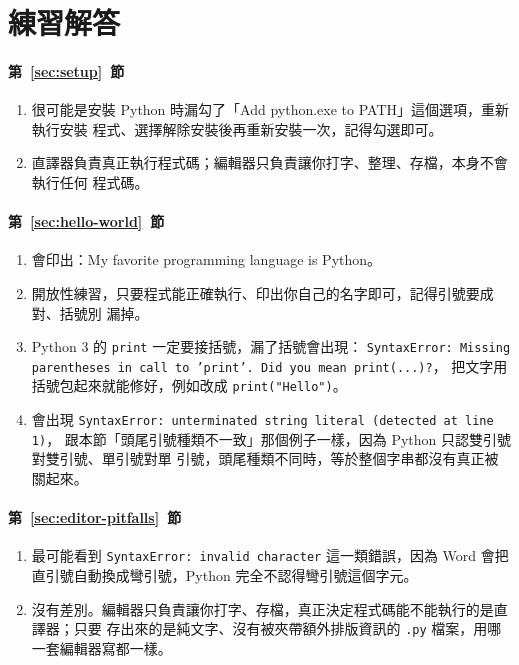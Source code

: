 \section*{練習解答}

\paragraph{第~\ref{sec:setup}~節}
\begin{enumerate}
\item 很可能是安裝 Python 時漏勾了「Add python.exe to PATH」這個選項，重新執行安裝
程式、選擇解除安裝後再重新安裝一次，記得勾選即可。
\item 直譯器負責真正執行程式碼；編輯器只負責讓你打字、整理、存檔，本身不會執行任何
程式碼。
\end{enumerate}

\paragraph{第~\ref{sec:hello-world}~節}
\begin{enumerate}
\item 會印出：My favorite programming language is Python。
\item 開放性練習，只要程式能正確執行、印出你自己的名字即可，記得引號要成對、括號別
漏掉。
\item Python 3 的 \texttt{print} 一定要接括號，漏了括號會出現：
\texttt{SyntaxError: Missing parentheses in call to 'print'. Did you mean print(...)?}，
把文字用括號包起來就能修好，例如改成 \texttt{print("Hello")}。
\item 會出現 \texttt{SyntaxError: unterminated string literal (detected at line 1)}，
跟本節「頭尾引號種類不一致」那個例子一樣，因為 Python 只認雙引號對雙引號、單引號對單
引號，頭尾種類不同時，等於整個字串都沒有真正被關起來。
\end{enumerate}

\paragraph{第~\ref{sec:editor-pitfalls}~節}
\begin{enumerate}
\item 最可能看到 \texttt{SyntaxError: invalid character} 這一類錯誤，因為 Word 會把
直引號自動換成彎引號，Python 完全不認得彎引號這個字元。
\item 沒有差別。編輯器只負責讓你打字、存檔，真正決定程式碼能不能執行的是直譯器；只要
存出來的是純文字、沒有被夾帶額外排版資訊的 \texttt{.py} 檔案，用哪一套編輯器寫都一樣。
\end{enumerate}


